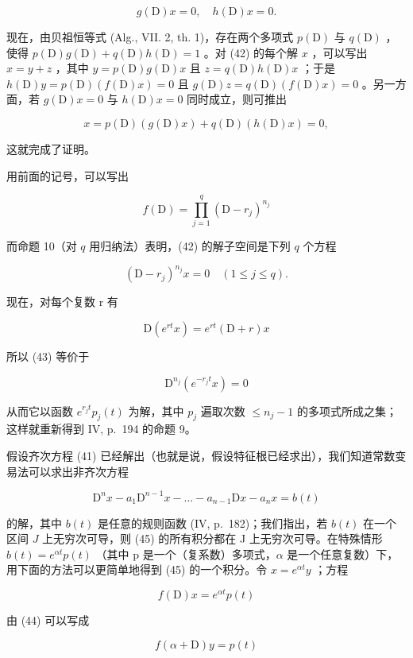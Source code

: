 \[
g (\mathrm{D}) x = 0, \quad h (\mathrm{D}) x = 0.
\]

现在，由贝祖恒等式 (Alg., VII. 2, th. 1)，存在两个多项式 \(p(\mathrm{D})\) 与 \(q(\mathrm{D})\) ，使得 \(p(\mathrm{D})g(\mathrm{D}) + q(\mathrm{D})h(\mathrm{D}) = 1\) 。对 (42) 的每个解 \(x\) ，可以写出 \(x = y + z\) ，其中 \(y = p(\mathrm{D})g(\mathrm{D})x\) 且 \(z = q(\mathrm{D})h(\mathrm{D})x\) ；于是 \(h(\mathrm{D})y = p(\mathrm{D})(f(\mathrm{D})x) = 0\) 且 \(g(\mathrm{D})z = q(\mathrm{D})(f(\mathrm{D})x) = 0\) 。另一方面，若 \(g(\mathrm{D})x = 0\) 与 \(h(\mathrm{D})x = 0\) 同时成立，则可推出

\[
x = p (\mathrm{D}) (g (\mathrm{D}) x) + q (\mathrm{D}) (h (\mathrm{D}) x) = 0,
\]

这就完成了证明。

用前面的记号，可以写出

\[
f (\mathrm{D}) = \prod_ {j = 1} ^ {q} (\mathrm{D} - r _ {j}) ^ {n _ {j}}
\]

而命题 10（对 \(q\) 用归纳法）表明，(42) 的解子空间是下列 \(q\) 个方程

\[
(\mathrm{D} - r _ {j}) ^ {n _ {j}} x = 0 \quad (1 \leqslant j \leqslant q).\tag{43}
\]

现在，对每个复数 r 有

\[
\mathrm{D} (e ^ {r t} x) = e ^ {r t} (\mathrm{D} + r) x\tag{44}
\]

所以 (43) 等价于

\[
\mathrm{D} ^ {n _ {j}} \left(e ^ {- r _ {j} t} x\right) = 0
\]

从而它以函数 \(e^{r_{j}t} p_{j}(t)\) 为解，其中 \(p_{j}\) 遍取次数 \(\leqslant n_{j}-1\) 的多项式所成之集；这样就重新得到 IV, p.~194 的命题 9。

假设齐次方程 (41) 已经解出（也就是说，假设特征根已经求出），我们知道常数变易法可以求出非齐次方程

\[
\mathrm{D} ^ {n} x - a _ {1} \mathrm{D} ^ {n - 1} x - \dots - a _ {n - 1} \mathrm{D} x - a _ {n} x = b (t)\tag{45}
\]

的解，其中 \(b(t)\) 是任意的规则函数 (IV, p.~182)；我们指出，若 \(b(t)\) 在一个区间 \(J\) 上无穷次可导，则 (45) 的所有积分都在 J 上无穷次可导。在特殊情形 \(b(t) = e^{\alpha t} p(t)\) （其中 p 是一个（复系数）多项式，\(\alpha\) 是一个任意复数）下，用下面的方法可以更简单地得到 (45) 的一个积分。令 \(x = e^{\alpha t} y\) ；方程

\[
f (\mathrm{D}) x = e ^ {\alpha t} p (t)
\]

由 (44) 可以写成

\[
f (\alpha + \mathrm{D}) y = p (t)
\]

